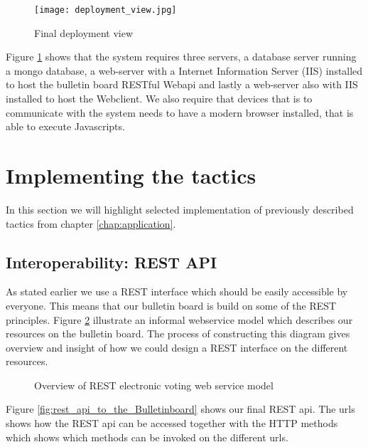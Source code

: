 \begin{figure}[H]
    \centering
    \texttt{[image: deployment\_view.jpg]}
    \caption{Final deployment view}
    \label{fig:final_deployment_view}
\end{figure}

\noindent
Figure \ref{fig:final_deployment_view} shows that the system requires three servers, a database server running a mongo database, a web-server with a Internet Information Server (IIS) installed to host the bulletin board RESTful Webapi and lastly a web-server also with IIS installed to host the Webclient. We also require that devices that is to communicate with the system needs to have a modern browser installed, that is able to execute Javascripts. 


\section{Implementing the tactics}
In this section we will highlight selected implementation of previously described tactics from chapter \ref{chap:application}.

\subsection{Interoperability: REST API}
As stated earlier we use a REST interface which should be easily accessible by everyone. This means that our bulletin board is build on some of the REST principles. Figure \ref{fig:rest_electronic_voting_web_service_model} illustrate an informal webservice model which describes our resources on the bulletin board. The process of constructing this diagram gives overview and insight of how we could design a REST interface on the different resources. 

\begin{figure}[H]
    \centering
     \caption{Overview of REST electronic voting web service model}
     \label{fig:rest_electronic_voting_web_service_model}
\end{figure}


\noindent
Figure \ref{fig:rest_api_to_the_Bulletinboard} shows our final REST api. The urls shows how the REST api can be accessed together with the HTTP methods which shows which methods can be invoked on the different urls. 


